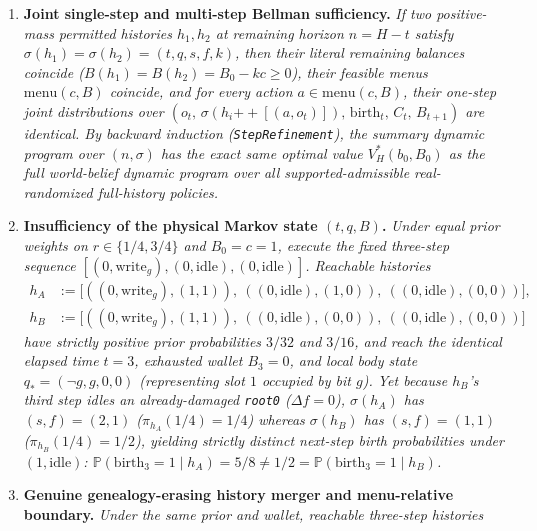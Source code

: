 \documentclass[11pt,letterpaper]{article}
\providecommand{\tightlist}{\setlength{\itemsep}{2pt}\setlength{\parskip}{0pt}}
\begin{document}
\begin{enumerate}
\def\labelenumi{\arabic{enumi}.}
\tightlist
\item
  \textbf{Joint single-step and multi-step Bellman sufficiency.}
  \emph{If two positive-mass permitted histories \(h_1, h_2\) at
  remaining horizon \(n = H - t\) satisfy
  \(\sigma(h_1) = \sigma(h_2) = (t, q, s, f, k)\), then their literal
  remaining balances coincide (\(B(h_1) = B(h_2) = B_0 - kc \ge 0\)),
  their feasible menus \(\mathrm{menu}(c, B)\) coincide, and for every
  action \(a \in \mathrm{menu}(c, B)\), their one-step joint
  distributions over
  \((o_t,\, \sigma(h_i \mathbin{+\!+} [(a, o_t)]),\, \mathrm{birth}_t,\, C_t,\, B_{t+1})\)
  are identical. By backward induction (\texttt{StepRefinement}), the
  summary dynamic program over \((n, \sigma)\) has the exact same
  optimal value \(V_H^*(b_0, B_0)\) as the full world-belief dynamic
  program over all supported-admissible real-randomized full-history
  policies.}
\item
  \textbf{Insufficiency of the physical Markov state \((t, q, B)\).}
  \emph{Under equal prior weights on \(r \in \{1/4, 3/4\}\) and
  \(B_0 = c = 1\), execute the fixed three-step sequence
  \([(0, \mathrm{write}_g), (0, \mathrm{idle}), (0, \mathrm{idle})]\).
  Reachable histories} \[\begin{aligned}
  h_A &:= \bigl[((0,\mathrm{write}_g),(1,1)),\ ((0,\mathrm{idle}),(1,0)),\ ((0,\mathrm{idle}),(0,0))\bigr], \\
  h_B &:= \bigl[((0,\mathrm{write}_g),(1,1)),\ ((0,\mathrm{idle}),(0,0)),\ ((0,\mathrm{idle}),(0,0))\bigr]
  \end{aligned}\] \emph{have strictly positive prior probabilities
  \(3/32\) and \(3/16\), and reach the identical elapsed time \(t = 3\),
  exhausted wallet \(B_3 = 0\), and local body state
  \(q_* = (\neg g, g, 0, 0)\) (representing slot \(1\) occupied by bit
  \(g\)). Yet because \(h_B\)'s third step idles an already-damaged
  \texttt{root0} (\(\Delta f = 0\)), \(\sigma(h_A)\) has
  \((s,f) = (2,1)\) (\(\pi_{h_A}(1/4) = 1/4\)) whereas \(\sigma(h_B)\)
  has \((s,f) = (1,1)\) (\(\pi_{h_B}(1/4) = 1/2\)), yielding strictly
  distinct next-step birth probabilities under \((1, \mathrm{idle})\):
  \(\mathbb{P}(\mathrm{birth}_3 = 1 \mid h_A) = 5/8 \neq 1/2 = \mathbb{P}(\mathrm{birth}_3 = 1 \mid h_B)\).}
\item
  \textbf{Genuine genealogy-erasing history merger and menu-relative
  boundary.} \emph{Under the same prior and wallet, reachable three-step
  histories} \[\begin{aligned}

\end{aligned}\]
\end{enumerate}
\end{document}
